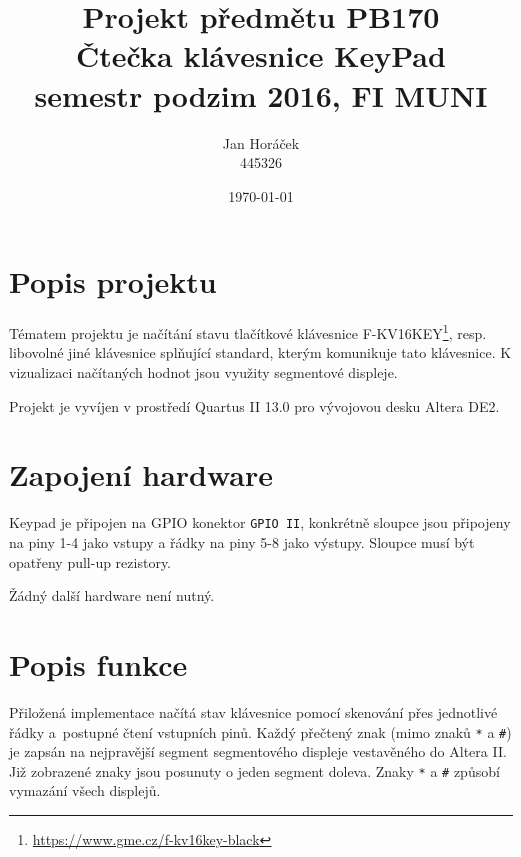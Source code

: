 \documentclass[12pt,a4paper]{article}
\begin{document}
\setcounter{page}{1}  %

\title{\normalsize Projekt předmětu PB170 \\ \huge Čtečka klávesnice KeyPad \\ \normalsize semestr podzim 2016, FI MUNI}
\author{Jan Horáček\\
	445326}
\date{\today}
\maketitle

\section{Popis projektu}

Tématem projektu je načítání stavu tlačítkové klávesnice F-KV16KEY\footnote{\href{https://www.gme.cz/f-kv16key-black}{https://www.gme.cz/f-kv16key-black}}, resp. libovolné jiné klávesnice
splňující standard, kterým komunikuje tato klávesnice. K vizualizaci načítaných hodnot jsou využity
segmentové displeje.

Projekt je vyvíjen v prostředí Quartus II 13.0 pro vývojovou desku Altera DE2.

\section{Zapojení hardware}

Keypad je připojen na GPIO konektor \texttt{GPIO II}, konkrétně sloupce jsou připojeny na piny 1-4 jako vstupy
a řádky na piny 5-8 jako výstupy. Sloupce musí být opatřeny pull-up rezistory.

Žádný další hardware není nutný.

\section{Popis funkce}

Přiložená implementace načítá stav klávesnice pomocí skenování přes
jednotlivé řádky a~postupné čtení vstupních pinů. Každý přečtený znak
(mimo znaků \texttt{*} a \texttt{\#}) je zapsán na nejpravější segment
segmentového displeje vestavěného do Altera II. Již zobrazené znaky
jsou posunuty o jeden segment doleva. Znaky \texttt{*} a \texttt{\#}
způsobí vymazání všech displejů.
\end{document}
